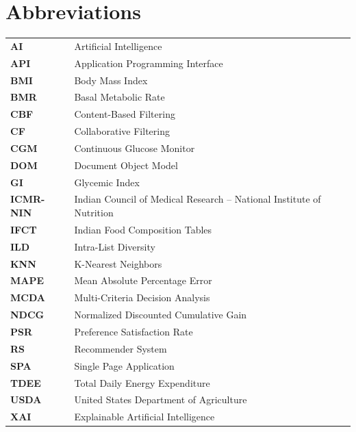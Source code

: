 \documentclass[12pt,a4paper]{report}
\begin{document}
\section*{Abbreviations}
\begin{tabularx}{\textwidth}{l X}
\textbf{AI} & Artificial Intelligence \\
\textbf{API} & Application Programming Interface \\
\textbf{BMI} & Body Mass Index \\
\textbf{BMR} & Basal Metabolic Rate \\
\textbf{CBF} & Content-Based Filtering \\
\textbf{CF} & Collaborative Filtering \\
\textbf{CGM} & Continuous Glucose Monitor \\
\textbf{DOM} & Document Object Model \\
\textbf{GI} & Glycemic Index \\
\textbf{ICMR-NIN} & Indian Council of Medical Research -- National Institute of Nutrition \\
\textbf{IFCT} & Indian Food Composition Tables \\
\textbf{ILD} & Intra-List Diversity \\
\textbf{KNN} & K-Nearest Neighbors \\
\textbf{MAPE} & Mean Absolute Percentage Error \\
\textbf{MCDA} & Multi-Criteria Decision Analysis \\
\textbf{NDCG} & Normalized Discounted Cumulative Gain \\
\textbf{PSR} & Preference Satisfaction Rate \\
\textbf{RS} & Recommender System \\
\textbf{SPA} & Single Page Application \\
\textbf{TDEE} & Total Daily Energy Expenditure \\
\textbf{USDA} & United States Department of Agriculture \\
\textbf{XAI} & Explainable Artificial Intelligence \\
\end{tabularx}
\end{document}
